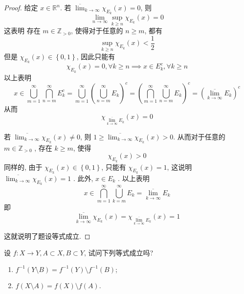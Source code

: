 \documentclass[../main.tex]{subfiles}
\begin{document}
\begin{proof}
    给定 \(  x \in \mathbb{R} ^{n}  \). 若 \(  \overline{\lim}_{k\to \infty} \chi _{E_{k}}\left( x \right)= 0   \), 则 \[
    \lim_{n\to \infty} \sup _{k\ge n}\chi _{E_{k}}\left( x \right)= 0 
    \]  这表明 存在 \(  m \in \mathbb{Z} _{> 0}  \), 使得对于任意的 \(  n\ge m  \), 都有  \[
    \sup _{k\ge n}\chi _{E_{k}}\left( x \right)< \frac{1 }{2 }  
    \]  但是 \(  \chi _{E_{k}}\left( x \right)\in \left\{ 0,1 \right\}   \), 因此只能有 \[
    \chi _{E_{k}}\left( x \right)= 0, \forall k\ge n \implies  x \in E_{k}^{c},\forall k\ge n 
    \] 以上表明 \[
    x \in  \bigcup _{m= 1}^{\infty} \bigcap _{n = m}^{\infty} E_{k}^{c}= \bigcup _{m= 1}^{\infty}\left( \bigcup _{n = m}^{\infty}E_{k} \right)^{c}= \left( \bigcap _{m= 1}^{\infty}  \bigcup _{n = m}^{\infty}E_{k} \right)^{c}= \left( \overline{\lim_{k\to \infty}}E_{k} \right)^{c}   
    \]从而 \[
    \chi _{\overline{\lim_{k\to \infty}}E_{k}}\left( x \right)= 0 
    \]

    若  \(  \overline{\lim_{k\to \infty}}\chi _{E_{k}}\left( x \right)\neq 0   \), 则 \(  1\ge   \overline{\lim_{k\to \infty}}\chi _{E_{k}}\left( x \right)> 0  \). 从而对于任意的 \(  m\in \mathbb{Z} _{> 0}   \) , 存在 \( k\ge m  \), 使得 \[
   \chi _{E_{k}}\left( x \right)> 0
    \]  同样的, 由于 \(  \chi _{E_{k}}\left( x \right)\in \left\{ 0,1 \right\}   \), 只能有 \(  \chi _{E_{k}}\left( x \right)= 1   \), 这说明 \(  \overline{\lim_{k\to \infty}}\chi _{E_{k}}\left( x \right)= 1   \) .   此外, \(  x \in E_{k}  \) . 以上表明\[
    x \in \bigcap _{m= 1}^{\infty}\bigcup _{k= m}^{\infty}E_{k}= \overline{\lim_{k\to \infty}}E_{k}
    \]即 \[
    \overline{\lim_{k\to \infty}}\chi _{E_{k}}\left( x \right)=  \chi _{\overline{\lim_{k\to \infty}}E_{k}}\left( x \right)= 1 
    \]

    这就说明了题设等式成立.
\end{proof}
\begin{exercise}{}{}
    设 $f: X \to Y, A \subset X, B \subset Y$, 试问下列等式成立吗?
\begin{enumerate}
\item[(i)] $f^{-1}(Y \setminus B) = f^{-1}(Y) \setminus f^{-1}(B)$;
\item[(ii)] $f(X \setminus A) = f(X) \setminus f(A)$.
\end{enumerate}
\end{exercise}
\end{document}
